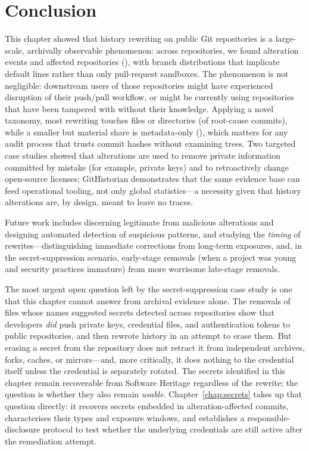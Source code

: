 \section{Conclusion}
\label{sec:hist-conclusion}

This chapter showed that history rewriting on public Git repositories is a large-scale, archivally observable phenomenon: across \OriginsTwoVisitsOrMoreShort repositories, we found \AlteredCommitsShort alteration events and \GitOriginsRootCauseCommitsShort affected repositories (\PercentOriginsAltered), with branch distributions that implicate default lines rather than only pull-request sandboxes.
The phenomenon is not negligible: downstream users of those repositories might have experienced disruption of their push/pull workflow, or might be currently using repositories that have been tampered with without their knowledge.
Applying a novel taxonomy, most rewriting touches files or directories (\PercentDIRRootCauseCommits of root-cause commits), while a smaller but material share is metadata-only (\PercentMETARootCauseCommits), which matters for any audit process that trusts commit hashes without examining trees.
Two targeted case studies showed that alterations are used to remove private information committed by mistake (for example, private keys) and to retroactively change open-source licenses; GitHistorian demonstrates that the same evidence base can feed operational tooling, not only global statistics---a necessity given that history alterations are, by design, meant to leave no traces.

Future work includes discerning legitimate from malicious alterations and designing automated detection of suspicious patterns, and studying the \emph{timing} of rewrites---distinguishing immediate corrections from long-term exposures, and, in the secret-suppression scenario, early-stage removals (when a project was young and security practices immature) from more worrisome late-stage removals.

The most urgent open question left by the secret-suppression case study is one that this chapter cannot answer from archival evidence alone.
The \SecretsRemovedAllShort removals of files whose names suggested secrets detected across \SecretsOriginsAllShort repositories show that developers \emph{did} push private keys, credential files, and authentication tokens to public repositories, and then rewrote history in an attempt to erase them.
But erasing a secret from the repository does not retract it from independent archives, forks, caches, or mirrors---and, more critically, it does nothing to the credential itself unless the credential is separately rotated.
The secrets identified in this chapter remain recoverable from Software Heritage regardless of the rewrite; the question is whether they also remain \emph{usable}.
Chapter~\ref{chap:secrets} takes up that question directly: it recovers secrets embedded in alteration-affected commits, characterises their types and exposure windows, and establishes a responsible-disclosure protocol to test whether the underlying credentials are still active after the remediation attempt.
